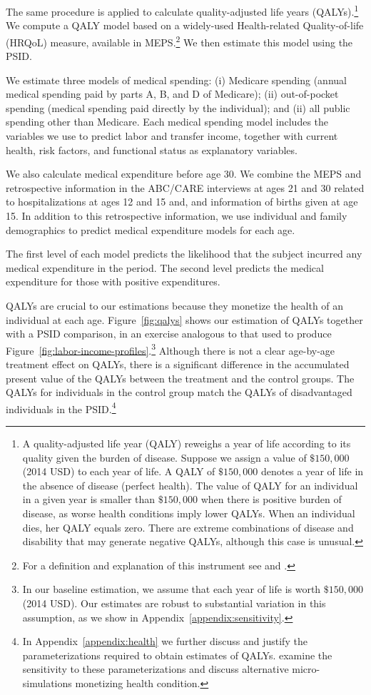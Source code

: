 The same procedure is applied to calculate quality-adjusted life years (QALYs).\footnote{A quality-adjusted life year (QALY) reweighs a year of life according to its quality given the burden of disease. Suppose we assign a value of $\$150,000$ (2014 USD) to each year of life. A QALY of $\$150,000$ denotes a year of life in the absence of disease (perfect health). The value of QALY for an individual in a given year is smaller than $\$150,000$ when there is positive burden of disease, as worse health conditions imply lower QALYs. When an individual dies, her QALY equals zero. There are extreme combinations of disease and disability that may generate negative QALYs, although this case is unusual.} We compute a QALY model based on a widely-used Health-related Quality-of-life (HRQoL) measure, available in MEPS.\footnote{For a definition and explanation of this instrument see \citet{Shaw_etal_2005_EQ5D_MC} and \citet{Dolan_1997_Modeling_MC}.} We then estimate this model using the PSID.

We estimate three models of medical spending: (i) Medicare spending (annual medical spending paid by parts A, B, and D of Medicare); (ii) out-of-pocket spending (medical spending paid directly by the individual); and (ii) all public spending other than Medicare. Each medical spending model includes the variables we use to predict labor and transfer income, together with current health, risk factors, and functional status as explanatory variables.

We also calculate medical expenditure before age 30. We combine the MEPS and retrospective information in the ABC/CARE interviews at ages 21 and 30 related to hospitalizations at ages 12 and 15 and, and information of births given at age 15. In addition to this retrospective information, we use individual and family demographics to predict medical expenditure models for each age.

The first level of each model predicts the likelihood that the subject incurred any medical expenditure in the period. The second level predicts the medical expenditure for those with positive expenditures.

QALYs are crucial to our estimations because they monetize the health of an individual at each age. Figure~\ref{fig:qalys} shows our estimation of QALYs together with a PSID comparison, in an exercise analogous to that used to produce Figure~\ref{fig:labor-income-profiles}.\footnote{In our baseline estimation, we assume that each year of life is worth  $\$150,000$ (2014 USD). Our estimates are robust to substantial variation in this assumption, as we show in Appendix~\ref{appendix:sensitivity}.} Although there is not a clear age-by-age treatment effect on QALYs, there is a significant difference in the accumulated present value of the QALYs between the treatment and the control groups. The QALYs for individuals in the control group match the QALYs of disadvantaged individuals in the PSID.\footnote{In Appendix~\ref{appendix:health} we further discuss and justify the parameterizations required to obtain estimates of QALYs. \citet{Goldman_etal_2015_Future-America-Model} examine the sensitivity to these parameterizations and discuss alternative micro-simulations monetizing health condition.}

